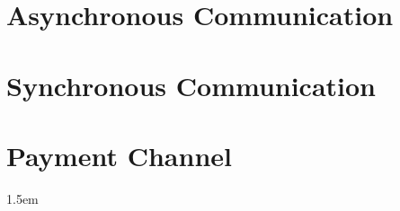 \documentclass[11pt]{article}
\begin{document}
\section{Asynchronous Communication} \label{sec:async}


\section{Synchronous Communication} \label{sec:sync}


\clearpage
%
%
\section{Payment Channel}


%	

%	
%
%	
%
%	
%
%
%	
%
%	
%
%
%	
%
%	



\clearpage

\emergencystretch 1.5em

\end{document}
